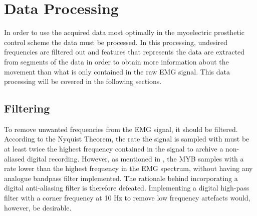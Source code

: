 \section{Data Processing}
In order to use the acquired data most optimally in the myoelectric prosthetic control scheme the data must be processed. In this processing, undesired frequencies are filtered out and features that represents the data are extracted from segments of the data in order to obtain more information about the movement than what is only contained in the raw EMG signal. This data processing will be covered in the following sections. 

\subsection{Filtering}
To remove unwanted frequencies from the EMG signal, it should be filtered. According to the Nyquist Theorem, the rate the signal is sampled with must be at least twice the highest frequency contained in the signal to archive a non-aliased digital recording. However, as mentioned in , the MYB samples with a rate lower than the highest frequency in the EMG spectrum, without having any analogue bandpass filter implemented. The rationale behind incorporating a digital anti-aliasing filter is therefore defeated. Implementing a digital high-pass filter with a corner frequency at 10 Hz to remove low frequency artefacts would, however, be desirable. \cite{Cram2012} 


